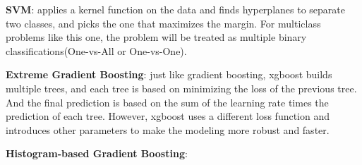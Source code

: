 \documentclass[12pt]{article}
\begin{document}
\textbf{SVM}: applies a kernel function on the data and finds hyperplanes to separate two classes, and picks the one that maximizes the margin. For multiclass problems like this one, the problem will be treated as multiple binary classifications(One-vs-All or One-vs-One).

\textbf{Extreme Gradient Boosting}: just like gradient boosting, xgboost builds multiple trees, and each tree is based on minimizing the loss of the previous tree. And the final prediction is based on the sum of the learning rate times the prediction of each tree. However, xgboost uses a different loss function and introduces other parameters to make the modeling more robust and faster.

\textbf{Histogram-based Gradient Boosting}:
\end{document}
